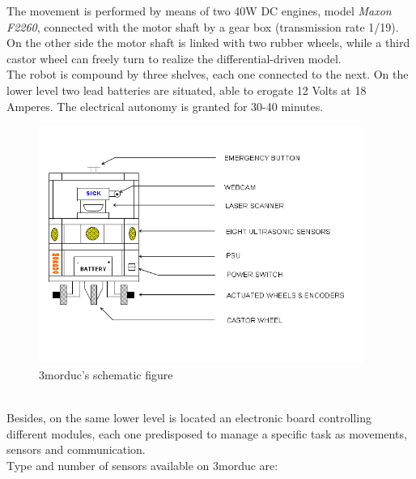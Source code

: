 The movement is performed by means of two 40W DC engines, model
\textit{Maxon F2260}, connected with the motor shaft by a gear
box (transmission rate 1/19). On the other side the motor shaft
is linked with two rubber wheels, while a third castor wheel can
freely turn to realize the differential-driven model.
\\
The robot is compound by three shelves, each one connected to
the next. On the lower level two lead batteries are situated,
able to erogate 12 Volts at 18 Amperes. The electrical autonomy is
granted for 30-40 minutes.
\begin{figure}[h]
  \begin{center}
    \includegraphics[width=300pt]{img/Morduc_scheme.png}
    \caption{3morduc's schematic figure}
    \label{fig:morduc_scheme}
  \end{center}
\end{figure}
\\
Besides, on the same lower level is located an electronic board
controlling different modules, each one predisposed to manage a
specific task as movements, sensors and communication.
\\
Type and number of sensors available on 3morduc are:

